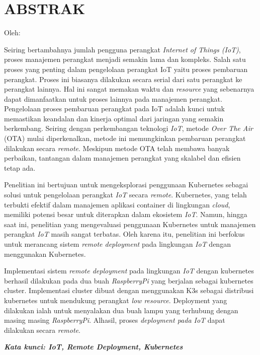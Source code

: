 \clearpage
\chapter*{ABSTRAK}
\begin{center}
  \center
  \begin{singlespace}
    \large\bfseries\MakeUppercase{\thetitle}
    
    \normalfont\normalsize
    Oleh:
    
    \bfseries \theauthor
  \end{singlespace}
\end{center}

\begin{singlespace}
  \small
  Seiring bertambahnya jumlah pengguna perangkat \textit{Internet of Things (IoT)}, proses manajemen perangkat menjadi semakin lama dan kompleks. Salah satu proses yang penting dalam pengelolaan perangkat IoT yaitu proses pembaruan perangkat. Proses ini biasanya dilakukan secara serial dari satu perangkat ke perangkat lainnya. Hal ini sangat memakan waktu dan \textit{resource} yang sebenarnya dapat dimanfaatkan untuk proses lainnya pada manajemen perangkat. Pengelolaan proses pembaruan perangkat pada IoT adalah kunci untuk memastikan keandalan dan kinerja optimal dari jaringan yang semakin berkembang. Seiring dengan perkembangan teknologi \textit{IoT}, metode \textit{Over The Air} (OTA) mulai diperkenalkan, metode ini memungkinkan pembaruan perangkat dilakukan secara \textit{remote}. Meskipun metode OTA telah membawa banyak perbaikan, tantangan dalam manajemen perangkat yang skalabel dan efisien tetap ada.
  
  Penelitian ini bertujuan untuk mengeksplorasi penggunaan Kubernetes sebagai solusi untuk pengelolaan perangkat \textit{IoT} secara \textit{remote}. Kubernetes, yang telah terbukti efektif dalam manajemen aplikasi container di lingkungan \textit{cloud}, memiliki potensi besar untuk diterapkan dalam ekosistem \textit{IoT}. Namun, hingga saat ini, penelitian yang mengevaluasi penggunaan Kubernetes untuk manajemen perangkat \textit{IoT} masih sangat terbatas. Oleh karena itu, penelitian ini berfokus untuk merancang sistem \textit{remote deployment} pada lingkungan \textit{IoT} dengan menggunakan Kubernetes.
  
  Implementasi sistem \textit{remote deployment} pada lingkungan \textit{IoT} dengan kubernetes berhasil dilakukan pada dua buah \textit{RaspberryPi} yang berjalan sebagai kubernetes cluster.  Implementasi cluster dibuat dengan menggunakan K3s sebagai distribusi kubernetes untuk mendukung perangkat \textit{low resource}. Deployment yang dilakukan ialah untuk menyalakan dua buah lampu yang terhubung dengan masing masing \textit{RaspberryPi}. Alhasil, proses \textit{deployment pada IoT} dapat dilakukan secara \textit{remote}.
  
  \textbf{\textit{Kata kunci: IoT, Remote Deployment, Kubernetes }}
  
\end{singlespace}
\clearpage